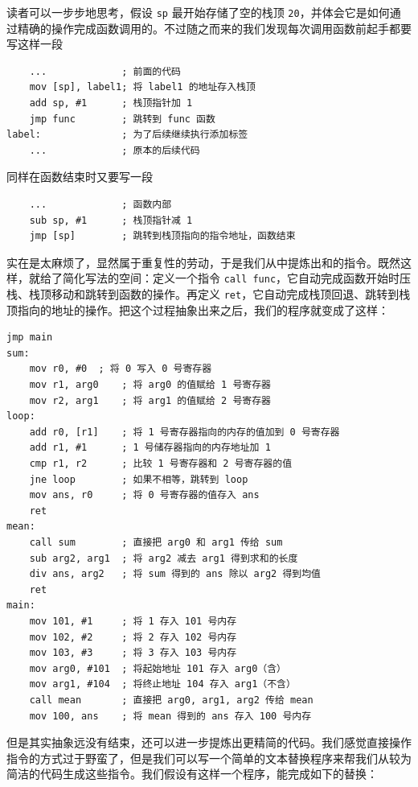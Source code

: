 读者可以一步步地思考，假设 \texttt{sp} 最开始存储了空的栈顶 \texttt{20}，并体会它是如何通过精确的操作完成函数调用的。不过随之而来的我们发现每次调用函数前起手都要写这样一段
\begin{verbatim}
    ...             ; 前面的代码
    mov [sp], label1; 将 label1 的地址存入栈顶
    add sp, #1      ; 栈顶指针加 1
    jmp func        ; 跳转到 func 函数
label:              ; 为了后续继续执行添加标签
    ...             ; 原本的后续代码
\end{verbatim}

同样在函数结束时又要写一段
\begin{verbatim}
    ...             ; 函数内部
    sub sp, #1      ; 栈顶指针减 1
    jmp [sp]        ; 跳转到栈顶指向的指令地址，函数结束
\end{verbatim}

实在是太麻烦了，显然属于重复性的劳动，于是我们从中提炼出和的指令。既然这样，就给了简化写法的空间：定义一个指令 \texttt{call func}，它自动完成函数开始时压栈、栈顶移动和跳转到函数的操作。再定义 \texttt{ret}，它自动完成栈顶回退、跳转到栈顶指向的地址的操作。把这个过程抽象出来之后，我们的程序就变成了这样：
\begin{verbatim}
jmp main
sum:
    mov r0, #0  ; 将 0 写入 0 号寄存器
    mov r1, arg0    ; 将 arg0 的值赋给 1 号寄存器
    mov r2, arg1    ; 将 arg1 的值赋给 2 号寄存器
loop:
    add r0, [r1]    ; 将 1 号寄存器指向的内存的值加到 0 号寄存器
    add r1, #1      ; 1 号储存器指向的内存地址加 1
    cmp r1, r2      ; 比较 1 号寄存器和 2 号寄存器的值
    jne loop        ; 如果不相等，跳转到 loop
    mov ans, r0     ; 将 0 号寄存器的值存入 ans
    ret
mean:
    call sum        ; 直接把 arg0 和 arg1 传给 sum
    sub arg2, arg1  ; 将 arg2 减去 arg1 得到求和的长度
    div ans, arg2   ; 将 sum 得到的 ans 除以 arg2 得到均值
    ret
main:
    mov 101, #1     ; 将 1 存入 101 号内存
    mov 102, #2     ; 将 2 存入 102 号内存
    mov 103, #3     ; 将 3 存入 103 号内存
    mov arg0, #101  ; 将起始地址 101 存入 arg0（含）
    mov arg1, #104  ; 将终止地址 104 存入 arg1（不含）
    call mean       ; 直接把 arg0, arg1, arg2 传给 mean
    mov 100, ans    ; 将 mean 得到的 ans 存入 100 号内存
\end{verbatim}

但是其实抽象远没有结束，还可以进一步提炼出更精简的代码。我们感觉直接操作指令的方式过于野蛮了，但是我们可以写一个简单的文本替换程序来帮我们从较为简洁的代码生成这些指令。我们假设有这样一个程序，能完成如下的替换：

